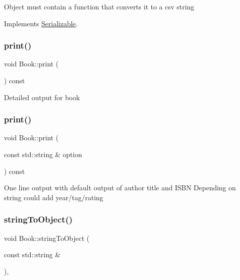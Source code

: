 Object must contain a function that converts it to a csv string 

Implements \hyperlink{classSerializable_ab9cd1db8311603ce4250478c3dd3eb81}{Serializable}.

\mbox{\label{classBook_af46441a304bd9d514fc9fb0cae3536cc}} 
\subsubsection{\texorpdfstring{print()}{print()}\hspace{0.1cm}{\footnotesize\ttfamily [1/2]}}
{\footnotesize\ttfamily void Book\+::print (\begin{DoxyParamCaption}{ }\end{DoxyParamCaption}) const}

Detailed output for book \mbox{\label{classBook_adf345a9bf2403f9d1d56aa10b2c26d3e}} 
\subsubsection{\texorpdfstring{print()}{print()}\hspace{0.1cm}{\footnotesize\ttfamily [2/2]}}
{\footnotesize\ttfamily void Book\+::print (\begin{DoxyParamCaption}\item[{const std\+::string \&}]{option }\end{DoxyParamCaption}) const}

One line output with default output of author title and I\+S\+BN Depending on string could add year/tag/rating \mbox{\label{classBook_a260ec829661a21befcf11a34e6c2aeca}} 
\subsubsection{\texorpdfstring{string\+To\+Object()}{stringToObject()}}
{\footnotesize\ttfamily void Book\+::string\+To\+Object (\begin{DoxyParamCaption}\item[{const std\+::string \&}]{ }\end{DoxyParamCaption})\hspace{0.3cm}{\ttfamily [override]}, {\ttfamily [virtual]}}

